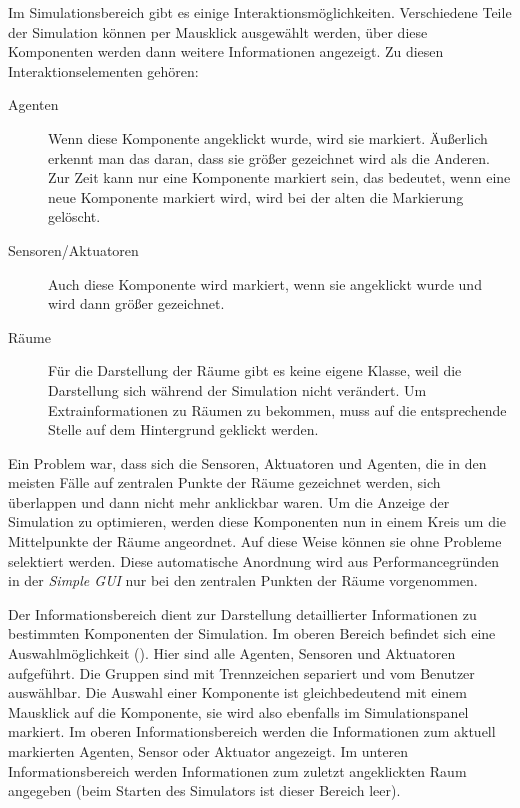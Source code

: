 Im Simulationsbereich gibt es einige Interaktionsmöglichkeiten. Verschiedene Teile der Simulation können per Mausklick ausgewählt werden, über diese Komponenten werden dann weitere Informationen angezeigt. Zu diesen Interaktionselementen gehören:
\begin{description}
\item[Agenten] Wenn diese Komponente angeklickt wurde, wird sie markiert. Äußerlich erkennt man das daran, dass sie größer gezeichnet wird als die Anderen. Zur Zeit kann nur eine Komponente markiert sein, das bedeutet, wenn eine neue Komponente markiert wird, wird bei der alten die Markierung gelöscht.
\item[Sensoren/Aktuatoren]  Auch diese Komponente wird markiert, wenn sie angeklickt wurde und wird dann größer gezeichnet.
\item[Räume] Für die Darstellung der Räume gibt es keine eigene Klasse, weil die Darstellung sich während der Simulation nicht verändert. Um Extrainformationen zu Räumen zu bekommen, muss auf die entsprechende Stelle auf dem Hintergrund geklickt werden.
\end{description} 

Ein Problem war, dass sich die Sensoren, Aktuatoren und Agenten, die in den meisten Fälle auf zentralen Punkte der Räume gezeichnet werden, sich überlappen und dann nicht mehr anklickbar waren. Um die Anzeige der Simulation zu optimieren, werden diese Komponenten nun in einem Kreis um die Mittelpunkte der Räume angeordnet. Auf diese Weise können sie ohne Probleme selektiert werden. Diese automatische Anordnung wird aus Performancegründen in der \emph{Simple GUI} nur bei den zentralen Punkten der Räume vorgenommen.

Der Informationsbereich dient zur Darstellung detaillierter Informationen zu bestimmten Komponenten der Simulation. Im oberen Bereich befindet sich eine Auswahlmöglichkeit (). Hier sind alle Agenten, Sensoren und Aktuatoren aufgeführt. Die Gruppen sind mit Trennzeichen separiert und vom Benutzer auswählbar. Die Auswahl einer Komponente ist gleichbedeutend mit einem Mausklick auf die Komponente, sie wird also ebenfalls im Simulationspanel markiert. Im oberen Informationsbereich werden die Informationen zum aktuell markierten Agenten, Sensor oder Aktuator angezeigt. Im unteren Informationsbereich werden Informationen zum zuletzt angeklickten Raum angegeben (beim Starten des Simulators ist dieser Bereich leer).


